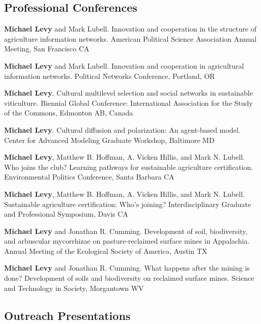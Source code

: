 \subsection{Professional Conferences}\label{professional-conferences}

\begin{description}
\tightlist
\item[2015]
\textbf{Michael Levy} and Mark Lubell. Innovation and cooperation in the
structure of agriculture information networks. American Political
Science Association Annual Meeting, San Francisco CA
\item[2015]
\textbf{Michael Levy} and Mark Lubell. Innovation and cooperation in
agricultural information networks. Political Networks Conference,
Portland, OR
\item[2015]
\textbf{Michael Levy}. Cultural multilevel selection and social networks
in sustainable viticulture. Biennial Global Conference: International
Association for the Study of the Commons, Edmonton AB, Canada
\item[2014]
\textbf{Michael Levy}. Cultural diffusion and polarization: An
agent-based model. Center for Advanced Modeling Graduate Workshop,
Baltimore MD
\item[2014]
\textbf{Michael Levy}, Matthew B. Hoffman, A. Vicken Hillis, and Mark N.
Lubell. Who joins the club? Learning pathways for sustainable
agriculture certification. Environmental Politics Conference, Santa
Barbara CA
\item[2014]
\textbf{Michael Levy}, Matthew B. Hoffman, A. Vicken Hillis, and Mark N.
Lubell. Sustainable agriculture certification: Who's joining?
Interdisciplinary Graduate and Professional Symposium, Davis CA
\item[2011]
\textbf{Michael Levy} and Jonathan R. Cumming. Development of soil,
biodiversity, and arbuscular mycorrhizae on pasture-reclaimed surface
mines in Appalachia. Annual Meeting of the Ecological Society of
America, Austin TX
\item[2011]
\textbf{Michael Levy} and Jonathan R. Cumming. What happens after the
mining is done? Development of soils and biodiversity on reclaimed
surface mines. Science and Technology in Society, Morgantown WV
\end{description}

\subsection{Outreach Presentations}\label{outreach-presentations}

